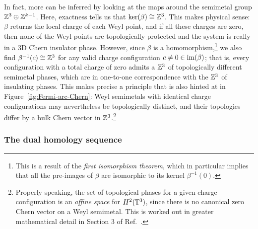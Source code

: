In fact, more can be inferred by looking at the maps around the semimetal group $\mathbb{Z}^3\oplus\mathbb{Z}^{k-1}$. Here, exactness tells us that $\ker(\beta)\cong\mathbb{Z}^3$. This makes physical sense: $\beta$ returns the local charge of each Weyl point, and if all these charges are zero, then none of the Weyl points are topologically protected and the system is really in a 3D Chern insulator phase. However, since $\beta$ is a homomorphism,\footnote{
	This is a result of the \emph{first isomorphism theorem}, which in particular implies that all the pre-images of $\beta$ are isomorphic to its kernel $\beta^{-1}(0)$.}
we also find $\beta^{-1}(c)\cong\mathbb{Z}^3$ for any valid charge configuration $c\neq 0\in\operatorname{im}(\beta)$; that is, every configuration with a total charge of zero admits a $\mathbb{Z}^3$ of topologically different semimetal phases, which are in one-to-one correspondence with the $\mathbb{Z}^3$ of insulating phases. This makes precise a principle that is also hinted at in Figure~\ref{fig:Fermi-arc-Chern}: Weyl semimetals with identical charge configurations may nevertheless be topologically distinct, and their topologies differ by a bulk Chern vector in $\mathbb{Z}^3$.\footnote{
	Properly speaking, the set of topological phases for a given charge configuration is an \emph{affine space} for $H^2(\mathbb{T}^3)$, since there is no canonical zero Chern vector on a Weyl semimetal. This is worked out in greater mathematical detail in Section 3 of Ref.~\cite{Mathai_math-review}.}


\subsubsection{The dual homology sequence}


